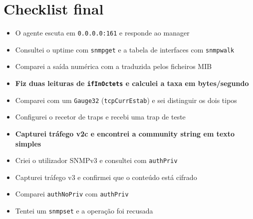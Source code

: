 \documentclass[11pt,a4paper]{article}
\begin{document}
\section{Checklist final}

\begin{itemize}
  \item[$\square$] O agente escuta em \texttt{0.0.0.0:161} e responde ao manager
  \item[$\square$] Consultei o uptime com \texttt{snmpget} e a tabela de interfaces com \texttt{snmpwalk}
  \item[$\square$] Comparei a saída numérica com a traduzida pelos ficheiros MIB
  \item[$\square$] \textbf{Fiz duas leituras de \texttt{ifInOctets} e calculei a taxa em bytes/segundo}
  \item[$\square$] Comparei com um \texttt{Gauge32} (\texttt{tcpCurrEstab}) e sei distinguir os dois tipos
  \item[$\square$] Configurei o recetor de traps e recebi uma trap de teste
  \item[$\square$] \textbf{Capturei tráfego v2c e encontrei a community string em texto simples}
  \item[$\square$] Criei o utilizador SNMPv3 e consultei com \texttt{authPriv}
  \item[$\square$] Capturei tráfego v3 e confirmei que o conteúdo está cifrado
  \item[$\square$] Comparei \texttt{authNoPriv} com \texttt{authPriv}
  \item[$\square$] Tentei um \texttt{snmpset} e a operação foi recusada
\end{itemize}
\end{document}
